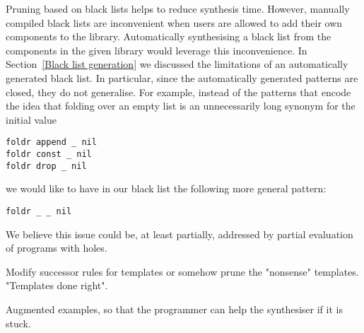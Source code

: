 Pruning based on black lists helps to reduce synthesis time. However, manually compiled black lists are inconvenient when users are allowed to add their own components to the library. Automatically synthesising a black list from the components in the given library would leverage this inconvenience. In Section~\ref{Black list generation} we discussed the limitations of an automatically generated black list. In particular, since the automatically generated patterns are closed, they do not generalise. For example, instead of the patterns that encode the idea that folding over an empty list is an unnecessarily long synonym for the initial value
\begin{lstlisting}[style=plain]
foldr append _ nil
foldr const _ nil
foldr drop _ nil
\end{lstlisting}
we would like to have in our black list the following more general pattern:
\begin{lstlisting}[style=plain]
foldr _ _ nil
\end{lstlisting}
We believe this issue could be, at least partially, addressed by partial evaluation of programs with holes. 



Modify successor rules for templates or somehow prune the "nonsense" templates. "Templates done right".

Augmented examples, so that the programmer can help the synthesiser if it is stuck.

